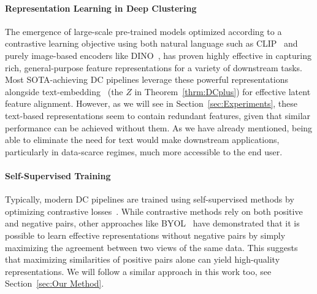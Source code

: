 \paragraph{Representation Learning in Deep Clustering} 
The emergence of large-scale pre-trained models optimized according to a contrastive learning objective using both natural language such as CLIP~\cite{radford2021learning} and purely image-based encoders like DINO~\cite{caron2021emerging,oquab2024dinov2learningrobustvisual}, has proven highly effective in capturing rich, general-purpose feature representations for a variety of downstream tasks. 
Most SOTA-achieving DC pipelines leverage these powerful representations alongside text-embedding~\cite{li2023image,cai2023semantic} (the $Z$ in Theorem~\ref{thrm:DCplus}) for effective latent feature alignment.  However, as we will see in Section~\ref{sec:Experiments}, these text-based representations seem to contain redundant features, given that similar performance can be achieved without them. As we have already mentioned, being able to eliminate the need for text would make downstream applications, particularly in data-scarce regimes, much more accessible to the end user.




\paragraph{Self-Supervised Training}
Typically, modern DC pipelines are trained using self-supervised methods by optimizing contrastive losses~\cite{oord2018representation}. While contrastive methods rely on both positive and negative pairs, other approaches like BYOL~\cite{grill2020bootstrap} have demonstrated that it is possible to learn effective representations without negative pairs by simply maximizing the agreement between two views of the same data. This suggests that maximizing similarities of positive pairs alone can yield high-quality representations. We will follow a similar approach in this work too, see Section~\ref{sec:Our Method}.


